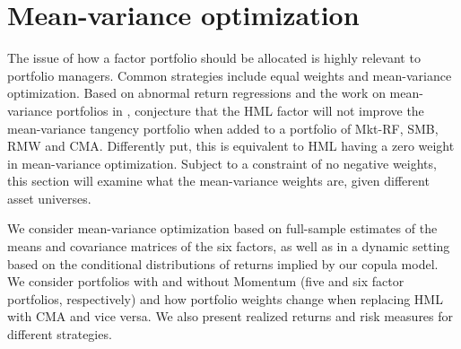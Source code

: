 
\section{Mean-variance optimization}
\label{sec:mean_variance}

The issue of how a factor portfolio should be allocated is highly relevant to portfolio managers. Common strategies include equal weights and mean-variance optimization. Based on abnormal return regressions and the work on mean-variance portfolios in \textcite{HubermanKandel1987}, \textcite{FF2015} conjecture that the HML factor will not improve the mean-variance tangency portfolio when added to a portfolio of Mkt-RF, SMB, RMW and CMA. Differently put, this is equivalent to HML having a zero weight in mean-variance optimization. Subject to a constraint of no negative weights, this section will examine what the mean-variance weights are, given different asset universes.

We consider mean-variance optimization based on full-sample estimates of the means and covariance matrices of the six factors, as well as in a dynamic setting based on the conditional distributions of returns implied by our copula model. We consider portfolios with and without Momentum (five and six factor portfolios, respectively) and how portfolio weights change when replacing HML with CMA and vice versa. We also present realized returns and risk measures for different strategies.



